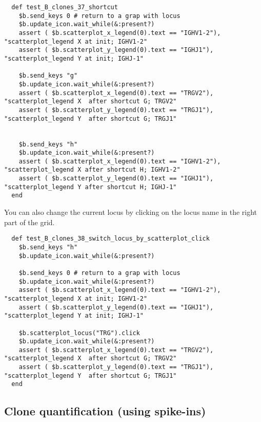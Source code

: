 \begin{verbatim}
  def test_B_clones_37_shortcut
    $b.send_keys 0 # return to a grap with locus 
    $b.update_icon.wait_while(&:present?)
    assert ( $b.scatterplot_x_legend(0).text == "IGHV1-2"), "scatterplot_legend X at init; IGHV1-2"
    assert ( $b.scatterplot_y_legend(0).text == "IGHJ1"), "scatterplot_legend Y at init; IGHJ-1"

    $b.send_keys "g"
    $b.update_icon.wait_while(&:present?)
    assert ( $b.scatterplot_x_legend(0).text == "TRGV2"), "scatterplot_legend X  after shortcut G; TRGV2"
    assert ( $b.scatterplot_y_legend(0).text == "TRGJ1"), "scatterplot_legend Y  after shortcut G; TRGJ1"
    

    $b.send_keys "h"
    $b.update_icon.wait_while(&:present?)
    assert ( $b.scatterplot_x_legend(0).text == "IGHV1-2"), "scatterplot_legend X after shortcut H; IGHV1-2"
    assert ( $b.scatterplot_y_legend(0).text == "IGHJ1"), "scatterplot_legend Y after shortcut H; IGHJ-1"
  end
\end{verbatim}

You can also change the current locus by clicking on the locus name in the
right part of the grid.
\begin{verbatim}
  def test_B_clones_38_switch_locus_by_scatterplot_click
    $b.send_keys "h"
    $b.update_icon.wait_while(&:present?)
    
    $b.send_keys 0 # return to a grap with locus 
    $b.update_icon.wait_while(&:present?)
    assert ( $b.scatterplot_x_legend(0).text == "IGHV1-2"), "scatterplot_legend X at init; IGHV1-2"
    assert ( $b.scatterplot_y_legend(0).text == "IGHJ1"), "scatterplot_legend Y at init; IGHJ-1"

    $b.scatterplot_locus("TRG").click
    $b.update_icon.wait_while(&:present?)
    assert ( $b.scatterplot_x_legend(0).text == "TRGV2"), "scatterplot_legend X  after shortcut G; TRGV2"
    assert ( $b.scatterplot_y_legend(0).text == "TRGJ1"), "scatterplot_legend Y  after shortcut G; TRGJ1"  
  end
\end{verbatim}

\subsection{Clone quantification (using spike-ins)}

